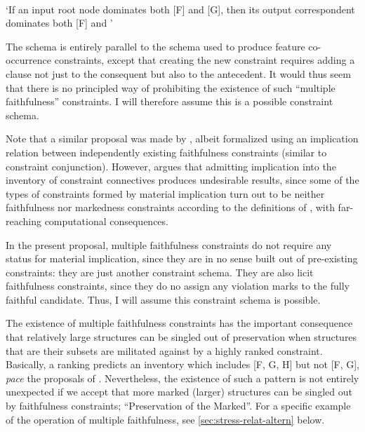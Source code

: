 \begin{constraint}
  \label{def:multiple-max}
  \\
  `If an input root node dominates both [F] and [G], then its output correspondent dominates both [F] and \ipa{[G]}'
\end{constraint}

The schema is entirely parallel to the schema used to produce feature co\hyp occurrence constraints, except that creating the new constraint requires adding a clause not just to the consequent but also to the antecedent. It would thus seem that there is no principled way of prohibiting the existence of such \enquote{multiple faithfulness} constraints. I will therefore assume this is a possible constraint schema.

Note that a similar proposal was made by \citet{crowhurst97:_boolean_optim_theor}, albeit formalized using an implication relation between independently existing faithfulness constraints (similar to constraint conjunction). However, \citet{wolf07:_what_ot} argues that admitting implication into the inventory of constraint connectives produces undesirable results, since some of the types of constraints formed by material implication turn out to be neither faithfulness nor markedness constraints according to the definitions of \citet{moreton2004}, with far\hyp reaching computational consequences.

In the present proposal, multiple faithfulness constraints do not require any status for material implication, since they are in no sense built out of pre\hyp existing constraints: they are just another constraint schema. They are also licit faithfulness constraints, since they do no assign any violation marks to the fully faithful candidate. Thus, I will assume this constraint schema is possible.

The existence of multiple faithfulness constraints has the important consequence that relatively large structures can be singled out of preservation when structures that are their subsets are militated against by a highly ranked constraint. Basically, a ranking  predicts an inventory which includes [F, G, H] but not [F, G], \emph{pace} the proposals of \citet{moren-psm,moren-foa}. Nevertheless, the existence of such a pattern is not entirely unexpected if we accept that more marked (\ie larger) structures can be singled out by faithfulness constraints; \cf {} \enquote{Preservation of the Marked}. For a specific example of the operation of multiple faithfulness, see \cref{sec:stress-relat-altern} below.

